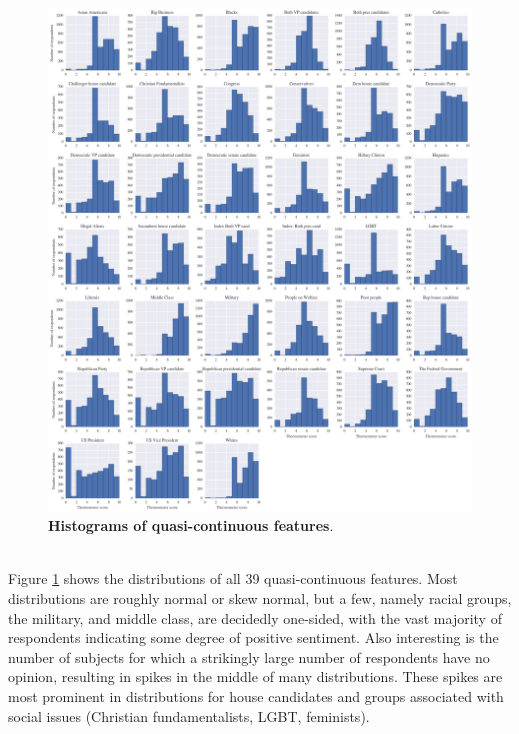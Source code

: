 \documentclass{article}
\begin{document}
	\begin{figure}[h!]
		\begin{center}
			\includegraphics*[width=1\linewidth]{thermometer_distribution}
			\caption{\textbf{Histograms of quasi-continuous features}. }
			\label{fig:thermometer_distribution}
		\end{center}
	\end{figure}

	\hfill \\
	Figure \ref{fig:thermometer_distribution} shows the distributions of all 39 quasi-continuous features. Most distributions are roughly normal or skew normal, but a few, namely racial groups, the military, and middle class, are decidedly one-sided, with the vast majority of respondents indicating some degree of positive sentiment. Also interesting is the number of subjects for which a strikingly large number of respondents have no opinion, resulting in spikes in the middle of many distributions. These spikes are most prominent in distributions for house candidates and groups associated with social issues (Christian fundamentalists, LGBT, feminists).
	
\end{document}
